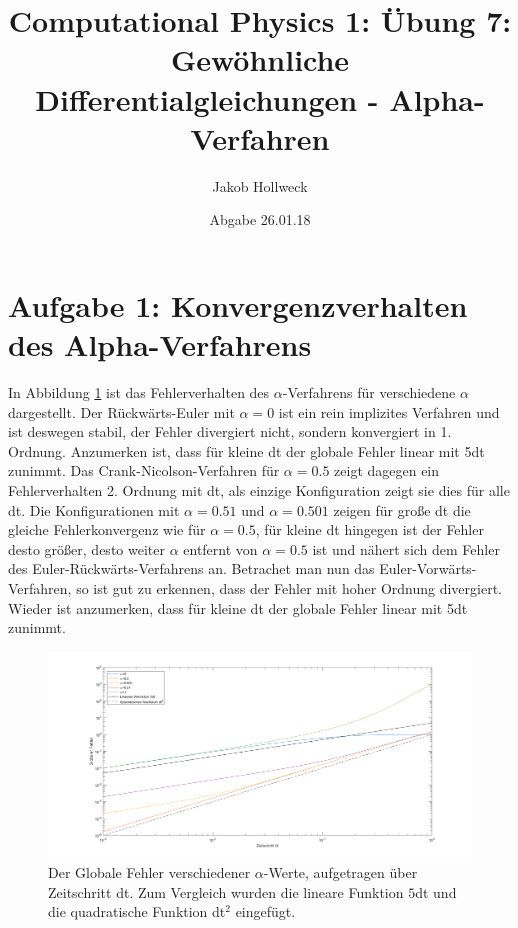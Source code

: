 \documentclass[a4paper, 10pt,onecolumn]{scrartcl}
\title{Computational Physics 1: Übung 7: Gewöhnliche Differentialgleichungen - Alpha-Verfahren}
\author{Jakob Hollweck} %
\date{Abgabe 26.01.18}
\begin{document}
\maketitle


\section*{Aufgabe 1: Konvergenzverhalten des Alpha-Verfahrens}

In Abbildung \ref{Abbildung1} ist das Fehlerverhalten des $\alpha$-Verfahrens für verschiedene $\alpha$ dargestellt. Der Rückwärts-Euler mit $\alpha = 0$ ist ein rein implizites Verfahren und ist deswegen stabil, der Fehler divergiert nicht, sondern konvergiert in 1. Ordnung. Anzumerken ist, dass für kleine dt der globale Fehler linear mit 5dt zunimmt.
Das Crank-Nicolson-Verfahren für $\alpha = 0.5$ zeigt dagegen ein Fehlerverhalten 2. Ordnung mit dt, als einzige Konfiguration zeigt sie dies für alle dt. Die Konfigurationen mit $\alpha = 0.51$ und $\alpha = 0.501$ zeigen für große dt die gleiche Fehlerkonvergenz wie für $\alpha = 0.5$, für kleine dt hingegen ist der Fehler desto größer, desto weiter $\alpha$ entfernt von $\alpha = 0.5$ ist und nähert sich dem Fehler des Euler-Rückwärts-Verfahrens an. 
Betrachet man nun das Euler-Vorwärts-Verfahren, so ist gut zu erkennen, dass der Fehler mit hoher Ordnung divergiert. Wieder ist anzumerken, dass für kleine dt der globale Fehler linear mit 5dt zunimmt.

\begin{figure}[ht!]
	\centering
	\includegraphics[scale=0.4,center]{Globaler Fehler_2.png}
	\caption{Der Globale Fehler verschiedener $\alpha$-Werte, aufgetragen über Zeitschritt dt. Zum Vergleich wurden die lineare Funktion $5$dt und die quadratische Funktion dt$^2$ eingefügt. } 
	\label{Abbildung1}
\end{figure}
\end{document}
